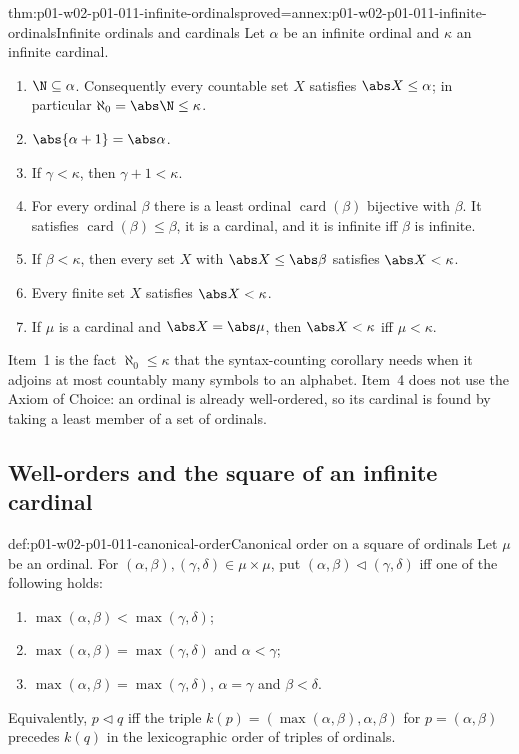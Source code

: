 \begin{hblemma}{thm:p01-w02-p01-011-infinite-ordinals}{proved=annex:p01-w02-p01-011-infinite-ordinals}{Infinite ordinals and cardinals}
Let \(\alpha\) be an infinite ordinal and \(\kappa\) an infinite cardinal.
\begin{enumerate}
  \item \(\N\subseteq\alpha\). Consequently every countable set \(X\)
        satisfies \(\abs X\leq\alpha\); in particular
        \(\aleph_0=\abs\N\leq\kappa\).
  \item \(\abs{\alpha+1}=\abs\alpha\).
  \item If \(\gamma<\kappa\), then \(\gamma+1<\kappa\).
  \item For every ordinal \(\beta\) there is a least ordinal
        \(\operatorname{card}(\beta)\) bijective with \(\beta\). It satisfies
        \(\operatorname{card}(\beta)\leq\beta\), it is a cardinal, and it is infinite iff
        \(\beta\) is infinite.
  \item If \(\beta<\kappa\), then every set \(X\) with
        \(\abs X\leq\abs\beta\) satisfies \(\abs X<\kappa\).
  \item Every finite set \(X\) satisfies \(\abs X<\kappa\).
  \item If \(\mu\) is a cardinal and \(\abs X=\abs\mu\), then
        \(\abs X<\kappa\) iff \(\mu<\kappa\).
\end{enumerate}
\end{hblemma}

Item~1 is the fact \(\aleph_0\leq\kappa\) that the syntax-counting
corollary needs when it adjoins at most countably many symbols to an
alphabet. Item~4 does not use the Axiom of Choice: an ordinal is already
well-ordered, so its cardinal is found by taking a least member of a set of
ordinals.

\subsection{Well-orders and the square of an infinite cardinal}
\label{sec:p01-w02-p01-011-square}

\begin{hbdefinition}{def:p01-w02-p01-011-canonical-order}{Canonical order on a square of ordinals}
Let \(\mu\) be an ordinal. For \((\alpha,\beta),(\gamma,\delta)\in\mu\times\mu\),
put \((\alpha,\beta)\lhd(\gamma,\delta)\) iff one of the following holds:
\begin{enumerate}
  \item \(\max(\alpha,\beta)<\max(\gamma,\delta)\);
  \item \(\max(\alpha,\beta)=\max(\gamma,\delta)\) and \(\alpha<\gamma\);
  \item \(\max(\alpha,\beta)=\max(\gamma,\delta)\), \(\alpha=\gamma\) and
        \(\beta<\delta\).
\end{enumerate}
Equivalently, \(p\lhd q\) iff the triple
\(k(p)=(\max(\alpha,\beta),\alpha,\beta)\) for \(p=(\alpha,\beta)\) precedes
\(k(q)\) in the lexicographic order of triples of ordinals.
\end{hbdefinition}

